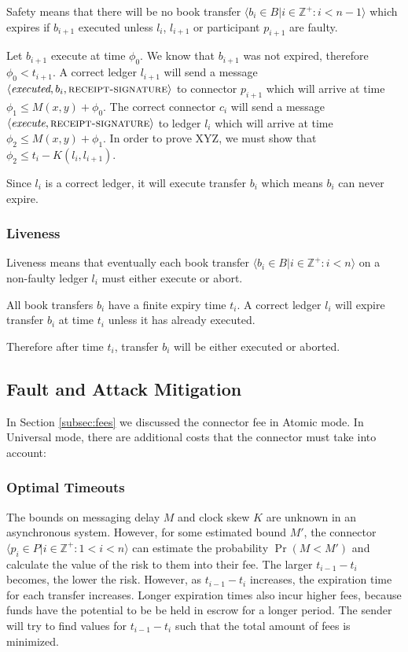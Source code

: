 \documentclass[letterpaper,twocolumn,10pt]{article}
\begin{document}
Safety means that there will be no book transfer $ \langle b_i \in B | i \in \mathbb{Z}^+ : i < n-1 \rangle $ which expires if $b_{i+1}$ executed unless $l_i$, $l_{i+1}$ or participant $p_{i+1}$ are faulty.

Let $b_{i+1}$ execute at time $\phi_0$. We know that $b_{i+1}$ was not expired, therefore $\phi_0 < t_{i+1}$. A correct ledger $l_{i+1}$ will send a message $\langle\textit{executed}, b_i, \textsc{receipt-signature}\rangle$ to connector $p_{i+1}$ which will arrive at time $\phi_1 \leq M(x,y) + \phi_0$. The correct connector $c_i$ will send a message $\langle\textit{execute}, \textsc{receipt-signature}\rangle$ to ledger $l_i$ which will arrive at time $\phi_2 \leq M(x,y) + \phi_1$. In order to prove XYZ, we must show that $\phi_2 \leq t_i - K(l_i, l_{i+1})$.

% 

Since $l_i$ is a correct ledger, it will execute transfer $b_i$ which means $b_i$ can never expire.

\subsubsection{Liveness}

Liveness means that eventually each book transfer $ \langle b_i \in B | i \in \mathbb{Z}^+ : i < n \rangle $ on a non-faulty ledger $l_i$ must either execute or abort.

All book transfers $b_i$ have a finite expiry time $t_i$. A correct ledger $l_i$ will expire transfer $b_i$ at time $t_i$ unless it has already executed.

Therefore after time $t_i$, transfer $b_i$ will be either executed or aborted.

\subsection{Fault and Attack Mitigation}

In Section \ref{subsec:fees} we discussed the connector fee in Atomic mode. In Universal mode, there are additional costs that the connector must take into account:


\subsubsection{Optimal Timeouts}
\label{subsubsec:optimal-timeouts}

The bounds on messaging delay $M$ and clock skew $K$ are unknown in an asynchronous system. However, for some estimated bound $M'$, the connector $ \langle p_i \in P | i \in \mathbb{Z}^+ : 1 < i < n \rangle $ can estimate the probability $\Pr(M < M')$ and calculate the value of the risk to them into their fee. The larger $t_{i-1} - t_i$ becomes, the lower the risk. However, as $t_{i-1} - t_i$ increases, the expiration time for each transfer increases. Longer expiration times also incur higher fees, because funds have the potential to be be held in escrow for a longer period. The sender will try to find values for $t_{i-1} - t_i$ such that the total amount of fees is minimized.
\end{document}
